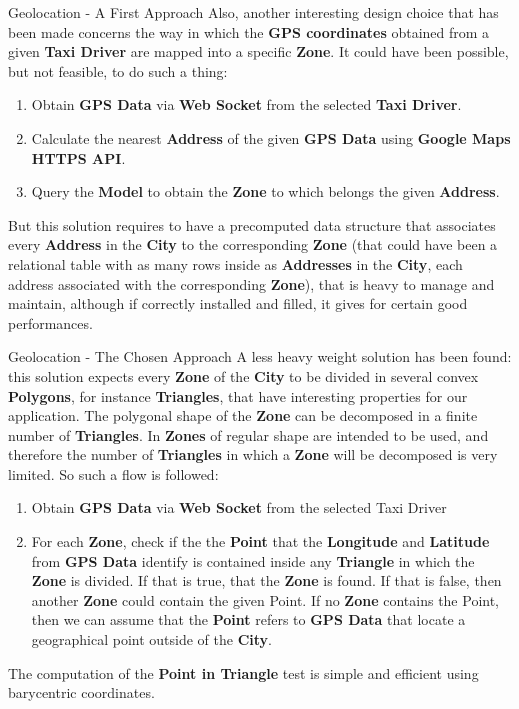 \documentclass{../common/latex_classes/pdf_presentation}
\begin{document}
	\begin{frame}{Geolocation - A First Approach}
		Also, another interesting design choice that has been made concerns the way in which the \textbf{GPS coordinates} obtained from a given \textbf{Taxi Driver} are mapped into a specific \textbf{Zone}.
		It could have been possible, but not feasible, to do such a thing:
		\begin{enumerate}
			\item Obtain \textbf{GPS Data} via \textbf{Web Socket} from the selected \textbf{Taxi Driver}.
			\item Calculate the nearest \textbf{Address} of the given \textbf{GPS Data} using \textbf{Google Maps HTTPS API}.
			\item Query the \textbf{Model} to obtain the \textbf{Zone} to which belongs the given \textbf{Address}.
		\end{enumerate}
		But this solution requires to have a precomputed data structure that associates every \textbf{Address} in the \textbf{City} to the corresponding \textbf{Zone} (that could have been a relational table with as many rows inside as \textbf{Addresses} in the \textbf{City}, each address associated with the corresponding \textbf{Zone}), that is heavy to manage and maintain, although if correctly installed and filled, it gives for certain good performances.
	\end{frame}

	\begin{frame}{Geolocation - The Chosen Approach}
		A less heavy weight solution has been found: this solution expects every \textbf{Zone} of the \textbf{City} to be divided in several convex \textbf{Polygons}, for instance \textbf{Triangles}, that have interesting properties for our application.
		The polygonal shape of the \textbf{Zone} can be decomposed in a finite number of \textbf{Triangles}.
		In \myTaxiService{} \textbf{Zones} of regular shape are intended to be used, and therefore the number of \textbf{Triangles} in which a \textbf{Zone} will be decomposed is very limited.
		So such a flow is followed:
		\begin{enumerate}
			\item Obtain \textbf{GPS Data} via \textbf{Web Socket} from the selected Taxi Driver
			\item For each \textbf{Zone}, check if the the \textbf{Point} that the \textbf{Longitude} and \textbf{Latitude} from \textbf{GPS Data} identify is contained inside any \textbf{Triangle} in which the \textbf{Zone} is divided. If that is true, that the \textbf{Zone} is found. If that is false, then another \textbf{Zone} could contain the given Point. If no \textbf{Zone} contains the Point, then we can assume that the \textbf{Point} refers to \textbf{GPS Data} that locate a geographical point outside of the \textbf{City}.
		\end{enumerate}
		The computation of the \textbf{Point in Triangle} test is simple and efficient using barycentric coordinates.
	\end{frame}
	
\end{document}
